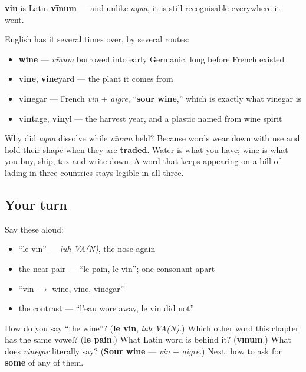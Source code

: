 \begin{cousinweb}
\textbf{vin} is Latin \textbf{vīnum} — and unlike \emph{aqua}, it is still recognisable everywhere it went.

English has it several times over, by several routes:

\begin{itemize}
\raggedright
  \item \textbf{wine} — \emph{vīnum} borrowed into early Germanic, long before French existed
  \item \textbf{vine}, \textbf{vine}yard — the plant it comes from
  \item \textbf{vin}egar — French \emph{vin} + \emph{aigre}, \textquotedblleft{}\textbf{sour wine},\textquotedblright{} which is exactly what vinegar is
  \item \textbf{vint}age, \textbf{vin}yl — the harvest year, and a plastic named from wine spirit
\end{itemize}

Why did \emph{aqua} dissolve while \emph{vīnum} held? Because words wear down with use and hold their shape when they are \textbf{traded}. Water is what you have; wine is what you buy, ship, tax and write down. A word that keeps appearing on a bill of lading in three countries stays legible in all three.
\end{cousinweb}

\subsection*{Your turn}
Say these aloud:

\begin{itemize}
\raggedright
  \item \textquotedblleft{}le vin\textquotedblright{} — \emph{luh VA(N)}, the nose again
  \item the near-pair — \textquotedblleft{}le pain, le vin\textquotedblright{}; one consonant apart
  \item \textquotedblleft{}vin $\to$ wine, vine, vinegar\textquotedblright{}
  \item the contrast — \textquotedblleft{}l'eau wore away, le vin did not\textquotedblright{}
\end{itemize}

\begin{tcolorbox}[breakable,colback=teal!4,colframe=teal!35!black,title={Before you move on}]
How do you say \textquotedblleft{}the wine\textquotedblright{}? (\textbf{le vin}, \emph{luh VA(N)}.) Which other word this chapter has the same vowel? (\textbf{le pain}.) What Latin word is behind it? (\textbf{vīnum}.) What does \emph{vinegar} literally say? (\textbf{Sour wine} — \emph{vin} + \emph{aigre}.) Next: how to ask for \textbf{some} of any of them.
\end{tcolorbox}
